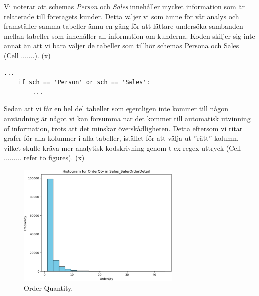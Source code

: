 \documentclass[]{article}
\begin{document}
Vi noterar att schemas \emph{Person} och \emph{Sales} innehåller mycket information som är relaterade till företagets kunder. Detta väljer vi som ämne för vår analys och framställer samma tabeller ännu en gång för att lättare undersöka sambanden mellan tabeller som innehåller all information om kunderna. Koden skiljer sig inte annat än att vi bara väljer de tabeller som tillhör schemas Persona och Sales (Cell .......).
\if(x)
\begin{lstlisting}
...
    if sch == 'Person' or sch == 'Sales':
	    ...
\end{lstlisting}
\fi

Sedan att vi får en hel del tabeller som egentligen inte kommer till någon användning är något vi kan försumma när det kommer till automatisk utvinning of information, trots att det minskar överskådligheten. Detta eftersom vi ritar grafer för alla kolumner i alla tabeller, istället för att välja ut ''rätt'' kolumn, vilket skulle kräva mer analytisk kodskrivning genom t ex regex-uttryck (Cell ......... refer to figures).
\if(x)
\begin{figure}[h]
    \centering
    \includegraphics[width=0.7\textwidth]{img_order_quantity.png}
    \caption{Order Quantity.}
\end{figure}

\fi
\end{document}
